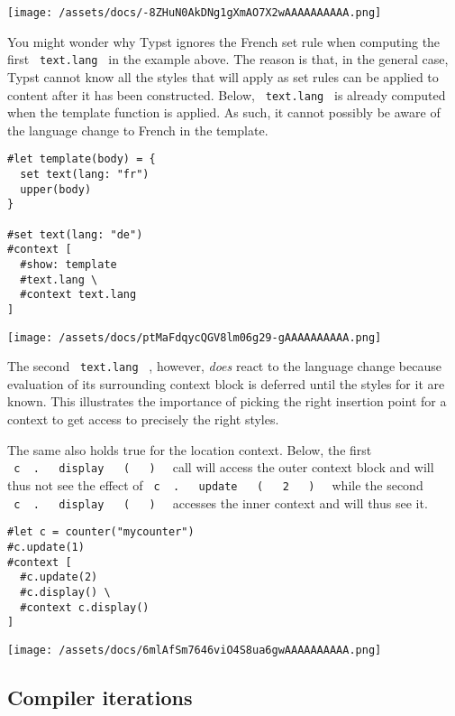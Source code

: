\texttt{[image: /assets/docs/-8ZHuN0AkDNg1gXmAO7X2wAAAAAAAAAA.png]}

You might wonder why Typst ignores the French set rule when computing
the first \texttt{\ text.lang\ } in the example above. The reason is
that, in the general case, Typst cannot know all the styles that will
apply as set rules can be applied to content after it has been
constructed. Below, \texttt{\ text.lang\ } is already computed when the
template function is applied. As such, it cannot possibly be aware of
the language change to French in the template.

\begin{verbatim}
#let template(body) = {
  set text(lang: "fr")
  upper(body)
}

#set text(lang: "de")
#context [
  #show: template
  #text.lang \
  #context text.lang
]
\end{verbatim}

\texttt{[image: /assets/docs/ptMaFdqycQGV8lm06g29-gAAAAAAAAAA.png]}

The second \texttt{\ text.lang\ } , however, \emph{does} react to the
language change because evaluation of its surrounding context block is
deferred until the styles for it are known. This illustrates the
importance of picking the right insertion point for a context to get
access to precisely the right styles.

The same also holds true for the location context. Below, the first
\texttt{\ c\ }{\texttt{\ .\ }}\texttt{\ }{\texttt{\ display\ }}\texttt{\ }{\texttt{\ (\ }}\texttt{\ }{\texttt{\ )\ }}\texttt{\ }
call will access the outer context block and will thus not see the
effect of
\texttt{\ c\ }{\texttt{\ .\ }}\texttt{\ }{\texttt{\ update\ }}\texttt{\ }{\texttt{\ (\ }}\texttt{\ }{\texttt{\ 2\ }}\texttt{\ }{\texttt{\ )\ }}\texttt{\ }
while the second
\texttt{\ c\ }{\texttt{\ .\ }}\texttt{\ }{\texttt{\ display\ }}\texttt{\ }{\texttt{\ (\ }}\texttt{\ }{\texttt{\ )\ }}\texttt{\ }
accesses the inner context and will thus see it.

\begin{verbatim}
#let c = counter("mycounter")
#c.update(1)
#context [
  #c.update(2)
  #c.display() \
  #context c.display()
]
\end{verbatim}

\texttt{[image: /assets/docs/6mlAfSm7646viO4S8ua6gwAAAAAAAAAA.png]}

\subsection{Compiler iterations}\label{compiler-iterations}

